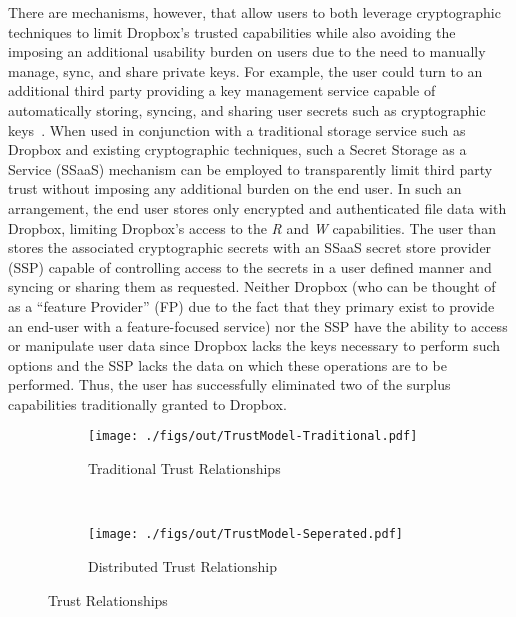 There are mechanisms, however, that allow users to both leverage
cryptographic techniques to limit Dropbox's trusted capabilities while
also avoiding the imposing an additional usability burden on users due
to the need to manually manage, sync, and share private keys. For
example, the user could turn to an additional third party providing a
key management service capable of automatically storing, syncing, and
sharing user secrets such as cryptographic
keys~\cite{custos-trios}. When used in conjunction with a traditional
storage service such as Dropbox and existing cryptographic techniques,
such a Secret Storage as a Service (SSaaS) mechanism can be employed
to transparently limit third party trust without imposing any
additional burden on the end user. In such an arrangement, the end
user stores only encrypted and authenticated file data with Dropbox,
limiting Dropbox's access to the \emph{R} and \emph{W}
capabilities. The user than stores the associated cryptographic
secrets with an SSaaS secret store provider (SSP) capable of
controlling access to the secrets in a user defined manner and syncing
or sharing them as requested. Neither Dropbox (who can be thought of
as a ``feature Provider'' (FP) due to the fact that they primary exist
to provide an end-user with a feature-focused service) nor the SSP have
the ability to access or manipulate user data since Dropbox lacks the
keys necessary to perform such options and the SSP lacks the data on
which these operations are to be performed. Thus, the user has
successfully eliminated two of the surplus capabilities traditionally
granted to Dropbox.

\begin{figure}[t]
  \centering
  \begin{subfigure}[t]{0.48\textwidth}
    \centering
    \texttt{[image: ./figs/out/TrustModel-Traditional.pdf]}
    \caption{Traditional Trust Relationships}
    \label{fig:mitigation:trust:traditional}
  \end{subfigure}
  ~
  \begin{subfigure}[t]{0.48\textwidth}
    \centering
    \texttt{[image: ./figs/out/TrustModel-Seperated.pdf]}
    \caption{Distributed Trust Relationship}
    \label{fig:mitigation:trust:distributed}
  \end{subfigure}
  \caption{Trust Relationships}
  \label{fig:mitigation:trust}
\end{figure}

